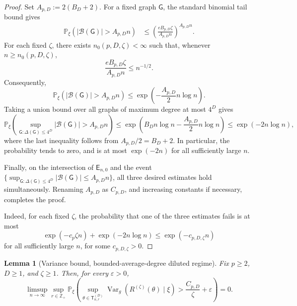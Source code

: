 \documentclass[12pt]{article}
\newtheorem{lemma}[theorem]{Lemma}
\renewcommand{\P}{\mathbb{P}}
\newcommand{\mcB}{\mathcal{B}}
\begin{document}
\begin{proof}
Set $A_{p,D}:=2(B_D+2)$. For a fixed graph \(\mathsf G\), the standard binomial tail bound gives
\[
\begin{aligned}
    \P_\xi\left(
        |\mcB(\mathsf G)|>A_{p,D}n
    \right)
    &\le
    \left(
        \frac{eB_{p,D}\zeta}
             {A_{p,D}n}
    \right)^{A_{p,D}n}.
\end{aligned}
\]
For each fixed \(\zeta\), there exists
\(n_0(p,D,\zeta)<\infty\) such that, whenever
\(n\ge n_0(p,D,\zeta)\),
\[
    \frac{eB_{p,D}\zeta}{A_{p,D}n}
    \le
    n^{-1/2}.
\]
Consequently,
\[
    \P_\xi\left(
        |\mcB(\mathsf G)|>A_{p,D}n
    \right)
    \le
    \exp\left(
        -\frac{A_{p,D}}2n\log n
    \right).
\]
Taking a union bound over all graphs of maximum degree at most \(4^D\)
gives
\[
    \P_\xi\left(
        \sup_{\mathsf G:\Delta(\mathsf G)\le4^D}
        |\mcB(\mathsf G)|
        >
        A_{p,D}n
    \right)
    \le
    \exp\left(
        B_Dn\log n
        -
        \frac{A_{p,D}}2n\log n
    \right)
    \le
    \exp(-2n\log n),
\]
where the last inequality follows from
\(A_{p,D}/2=B_D+2\). In particular, the probability tends to zero, and is at most \(\exp(-2n)\) for all sufficiently large \(n\).

Finally, on the intersection of \(\mathsf E_{n,0}\) and the event $ \{
        \sup_{\mathsf G:\Delta(\mathsf G)\le4^D}
        |\mcB(\mathsf G)|
        \le
        A_{p,D}n
    \}$, all three desired estimates hold simultaneously. Renaming
\(A_{p,D}\) as \(C_{p,D}\), and increasing constants if necessary,
completes the proof.

Indeed, for each fixed \(\zeta\), the probability that one of the three
estimates fails is at most
\[
    \exp(-c_p\zeta n)+\exp(-2n\log n)
    \le
    \exp(-c_{p,D,\zeta}n)
\]
for all sufficiently large \(n\), for some
\(c_{p,D,\zeta}>0\).
\end{proof}


\begin{lemma}[Variance bound, bounded-average-degree diluted regime]
\label{lem:zeta-residual-variance-dependency}
Fix \(p\ge2\), \(D\ge1\), and \(\zeta\ge1\). Then, for every
\(\varepsilon>0\),
\[
\limsup_{n\to\infty}
\sup_{r\in\mathbb Z_+}
\mathbb P_\xi\left(
\sup_{\theta\in\mathsf{T}_{n,r}^{(D)}}
\operatorname{Var}_g\!\left(R^{(\zeta)}(\theta)\mid \xi\right)
>
\frac{C_{p,D}}{\zeta}+\varepsilon
\right)
=0.
\]
\end{lemma}
\end{document}
